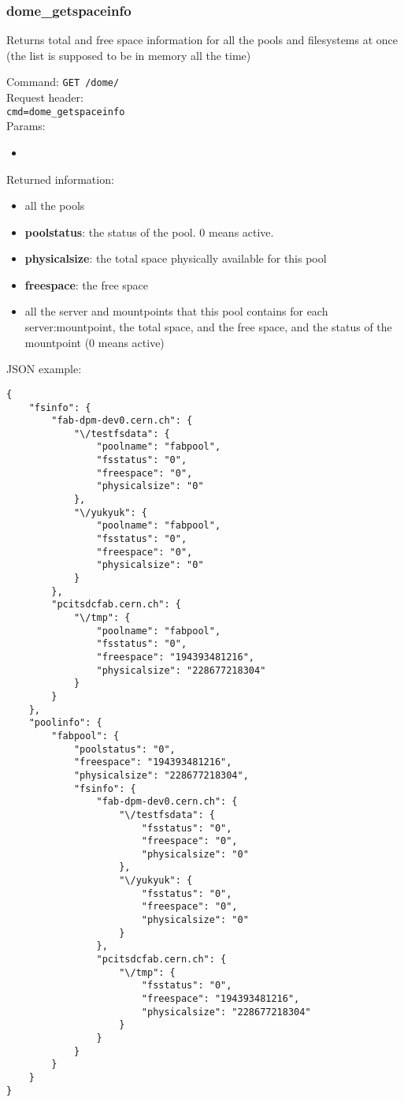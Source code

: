 \documentclass[a4paper,10pt]{scrreprt}
\begin{document}
\subsubsection{dome\_getspaceinfo}
Returns total and free space information for all the pools and filesystems at once (the list is supposed to be in memory all the time)

Command:
\lstinline"GET /dome/"\\
Request header:\\
\lstinline"cmd=dome_getspaceinfo"\\
Params:
\begin{itemize}
 \item 
\end{itemize}

Returned information:
\begin{itemize}
 \item all the pools
 \item \textbf{poolstatus}: the status of the pool. 0 means active.
 \item \textbf{physicalsize}: the total space physically available for this pool
 \item \textbf{freespace}: the free space
 
 
 \item all the server and mountpoints that this pool contains
 \subitem for each server:mountpoint, the total space, and the free space, and the status of the mountpoint (0 means active)
\end{itemize}

JSON example:\\
\begin{lstlisting}
{
    "fsinfo": {
        "fab-dpm-dev0.cern.ch": {
            "\/testfsdata": {
                "poolname": "fabpool",
                "fsstatus": "0",
                "freespace": "0",
                "physicalsize": "0"
            },
            "\/yukyuk": {
                "poolname": "fabpool",
                "fsstatus": "0",
                "freespace": "0",
                "physicalsize": "0"
            }
        },
        "pcitsdcfab.cern.ch": {
            "\/tmp": {
                "poolname": "fabpool",
                "fsstatus": "0",
                "freespace": "194393481216",
                "physicalsize": "228677218304"
            }
        }
    },
    "poolinfo": {
        "fabpool": {
            "poolstatus": "0",
            "freespace": "194393481216",
            "physicalsize": "228677218304",
            "fsinfo": {
                "fab-dpm-dev0.cern.ch": {
                    "\/testfsdata": {
                        "fsstatus": "0",
                        "freespace": "0",
                        "physicalsize": "0"
                    },
                    "\/yukyuk": {
                        "fsstatus": "0",
                        "freespace": "0",
                        "physicalsize": "0"
                    }
                },
                "pcitsdcfab.cern.ch": {
                    "\/tmp": {
                        "fsstatus": "0",
                        "freespace": "194393481216",
                        "physicalsize": "228677218304"
                    }
                }
            }
        }
    }
}
\end{lstlisting}
\end{document}
